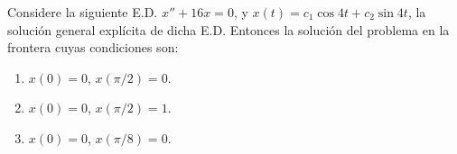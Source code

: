 \documentclass{beamer}
\begin{document}
\begin{frame}[t]
	\begin{example}
		Considere la siguiente E.D. \(x'' +16x=0\), y \(x(t) = c_1 \cos 4t+c_2 \sin 4t\), la solución general explícita de dicha E.D. Entonces la solución del problema en la frontera cuyas condiciones son:
		\begin{enumerate}
			\item \(x(0) =0\), \(x(\pi /2) =0\).
			\item \(x(0) =0\), \(x(\pi /2) =1\).
			\item \(x(0) =0\), \(x(\pi /8) =0\).
		\end{enumerate}
	\end{example}
\end{frame}
\end{document}
